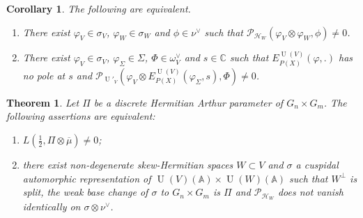 \documentclass[10pt,a4paper]{amsart}
\newtheorem{theorem}{Theorem}
\newtheorem{coro}{Corollary}
\newcommand{\C}{\mathbb{C}}
\DeclareMathOperator{\U}{U}
\newcommand{\bA}{\mathbb{A}}
\newcommand{\cH}{\mathcal{H}}
\newcommand{\cP}{\mathcal{P}}
\begin{document}
\begin{coro}
\label{cor:non_vanishing_of_periods}
    The following are equivalent.
    \begin{enumerate}
        \item There exist $\varphi_V \in \sigma_V$, $\varphi_W \in \sigma_W$  and $\phi \in \nu^\vee$ such that $\cP_{\cH_W} \left( \varphi_V \otimes \varphi_W , \phi \right) \neq 0$.
        \item There exist $\varphi_V \in \sigma_V$, $\varphi_\Sigma \in \Sigma$, $\Phi \in \omega^\vee_{V}$ and $s \in \C$ such that $E_{P(X)}^{\U(V)}(\varphi,.)$ has no pole at $s$ and $\cP_{\U'_V}\left( \varphi_V \otimes E_{P(X)}^{\U(V)}(\varphi_\Sigma,s) , \Phi \right) \neq 0$.
    \end{enumerate}
\end{coro}

\begin{theorem} \label{thm:GGP_arbitrary_corank}
Let $\Pi$ be a discrete Hermitian Arthur parameter of $G_n \times G_m$. The
following assertions are equivalent:
    \begin{enumerate}
        \item $L(\frac{1}{2}, \Pi \otimes \overline{\mu}) \neq 0$;
        \item there exist non-degenerate skew-Hermitian spaces $W\subset V$ and $\sigma$ a cuspidal automorphic representation of $\U(V)(\bA) \times \U(W)(\bA)$ such that $W^\perp$ is split, the weak base change of $\sigma$ to
            $G_n \times G_m$ is $\Pi$ and $\cP_{\cH_W}$ does not vanish identically on $\sigma \otimes
            \nu^\vee$.
    \end{enumerate}
\end{theorem}
\end{document}

